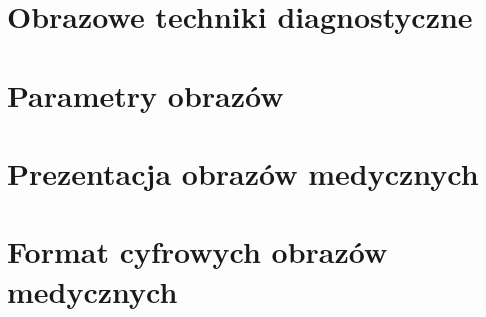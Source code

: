 
\section*{Obrazowe techniki diagnostyczne}


\section*{Parametry obrazów}


\section*{Prezentacja obrazów medycznych}


\section*{Format cyfrowych obrazów medycznych}


